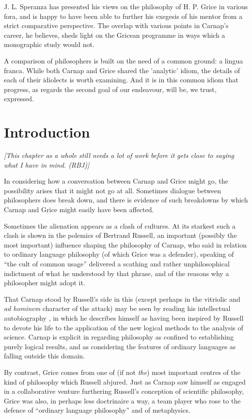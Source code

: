 \documentclass[10pt,titlepage]{book}
\begin{document}
J. L. Speranza has presented his views on the philosophy of H. P. Grice in  
various fora, and is happy to have been able to further his exegesis of his 
 mentor from a strict comparative perspective. The overlap with various  
points in Carnap's career, he believes, sheds light on the Gricean programme 
in  ways which a monographic study would not. 
 
A comparison of philosophers is built on the need of a common ground: a  
lingua franca. While both Carnap and Grice shared the 'analytic' idiom, the  
details of each of their idiolects is worth examining. And it is in this 
common  idiom that progress, as regards the second goal of our endeavour, will  
be, we trust, expressed.  

\chapter{Introduction}

{\it [This chapter as a whole still needs a lot of work before it gets close to saying what I have in mind. (RBJ)]}

In considering how a conversation between Carnap and Grice might go, the possibility arises that it might not go at all.
Sometimes dialogue between philosophers does break down, and there is evidence of such breakdowns by which Carnap and Grice might easily have been affected.

Sometimes the alienation appears as a clash of cultures.
At its starkest such a clash is shown in the polemics of Bertrand Russell, an important (possibly the most important) influence shaping the philosophy of Carnap, who said in relation to ordinary language philosophy (of which Grice was a defender), speaking of ``the cult of common usage'' delivered a scathing and rather unphilosophical indictment of what he understood by that phrase, and of the reasons why a philosopher might adopt it.

That Carnap stood by Russell's side in this (except perhaps in the vitriolic and \emph{ad hominem} character of the attack) may be seen by reading his intellectual autobiography \cite{carnap63a}, in which he describes himself as having been inspired by Russell to devote his life to the application of the new logical methods to the analysis of science.
Carnap is explicit in regarding philosophy as confined to establishing purely logical results, and as considering the features of ordinary languages as falling outside this domain.

By contrast, Grice comes from one of (if not {\it the}) most important centres of the kind of philosophy which Russell abjured.
Just as Carnap saw himself as engaged in a collaborative venture furthering Russell's conception of scientific philosophy, Grice was also, in perhaps less doctrinaire a way, a team player who rose to the defence of ``ordinary language philosophy'' and of metaphysics.
\end{document}
